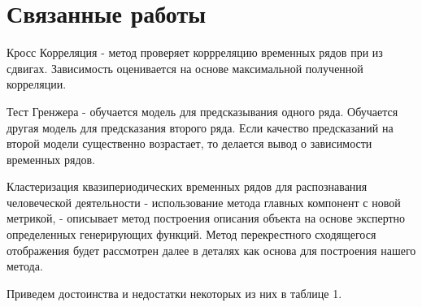 \documentclass[12pt, twoside]{article}
\begin{document}
\section{Связанные работы}	
\label{sec: related_works}
	
	Кросс Корреляция - метод проверяет коррреляцию временных рядов при из сдвигах. Зависимость оценивается на основе максимальной полученной корреляции.
	
	Тест Гренжера \cite{Seth2007} - обучается модель для предсказывания одного ряда. Обучается другая модель для предсказания второго ряда. Если качество предсказаний на второй модели существенно возрастает, то делается вывод о зависимости временных рядов.
	
	 Кластеризация квазипериодических временных рядов для распознавания человеческой деятельности \cite{Grabovoy2018} - использование метода главных компонент с новой метрикой, \cite{Kwapisz2010} - описывает метод построения описания объекта на основе экспертно определенных генерирующих функций.
	Метод перекрестного сходящегося отображения \cite{McCracken2014} будет рассмотрен далее в деталях как основа для построения нашего метода.
	
	Приведем достоинства и недостатки некоторых из них в таблице 1.
\end{document}

